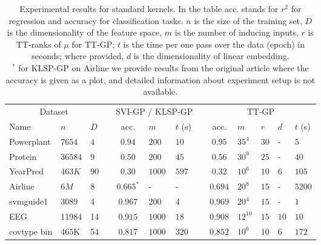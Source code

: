 \begin{table}[t]
  \caption[]{Experimental results for standard kernels. In the table acc. stands for $r^2$ for regression and accuracy
          for classification tasks. $n$ is the size of the
          training set, $D$ is the dimensionality of the feature space,
          $m$ is the number of inducing inputs, $r$ is TT-ranks of $\mu$ for TT-GP; $t$ is the time per one pass over
          the data (epoch) in seconds; where provided, $d$ is the dimensionality of linear embedding.\\
          $^*$ for KLSP-GP on Airline we provide results from the original
          article where the accuracy is given as a plot, and detailed
          information about experiment setup is not available.
          }
  \label{se_results}
  \centering
  \begin{tabular}{lll l cll l cllll}
    \toprule
    \multicolumn{3}{c}{Dataset} && \multicolumn{3}{c}{SVI-GP / KLSP-GP} && \multicolumn{5}{c}{TT-GP} \\
    \cmidrule{1-3}
    \cmidrule{5-7}
    \cmidrule{9-13}

    Name & $n$ & $D$ &&
    acc. & $m$ & $t$ (s) &&
    acc. & $m$ & $r$ & $d$ & $t$ (s)\\
    \midrule

    Powerplant & $7654$ & $4$ &&
    $0.94$ & $200$ & $10$ &&
    $0.95$ & $35^4$ & $30$ & - & $5$ \\

    Protein & $36584$ & $9$ &&
    $0.50$ & $200$ & $45$ &&
    $0.56$ & $30^9$ & $25$ & - & $40$ \\

    YearPred & $463K$ & $90$ &&
    $0.30$ & $1000$ & $597$ &&
    $0.32$ & $10^6$ & $10$ & $6$ & $105$ \\

    \midrule
    Airline & $6M$ & $8$ &&
    $0.665^*$ & - & - &&
    $0.694$ & $20^8$ & $15$ & - & $5200$ \\

    svmguide1 & 3089 & 4 &&
    $0.967$ & $200$ & $4$ &&
    $0.969$ & $20^4$ & $15$ & - & $1$\\

    EEG & 11984 & 14 &&
    $0.915$ & $1000$ & $18$ &&
    $0.908$ & $12^{10}$ & $15$ & $10$ & $10$\\

    covtype bin & 465K & 54 &&
    $0.817$ & $1000$ & $320$ &&
    $0.852$ & $10^6$ & $10$ & $6$ & $172$\\
    \bottomrule
  \end{tabular}
\end{table}
  
